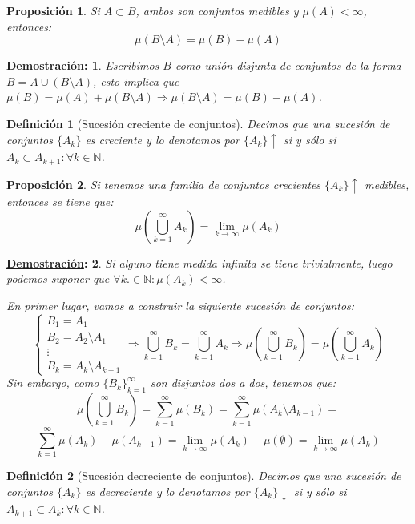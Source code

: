 \documentclass[10pt,a4paper,openright]{book}
\theoremstyle{break}
\newtheorem*{defi}{Definición}
\newtheorem*{prop}{Proposición}
\newtheorem*{demo}{\underline{Demostración}:}
\begin{document}
\begin{prop}
Si $A\subset B$, ambos son conjuntos medibles y $\mu(A) < \infty$, entonces:
$$\mu(B\setminus A) = \mu(B) - \mu(A)$$
\end{prop}
\begin{demo}
Escribimos $B$ como unión disjunta de conjuntos de la forma $B=A\cup (B\setminus A)$, esto implica que $\mu(B) = \mu(A) + \mu(B\setminus A) \Rightarrow \mu(B\setminus A) =  \mu(B) - \mu(A)$.
\end{demo}

\begin{defi}[Sucesión creciente de conjuntos]
Decimos que una sucesión de conjuntos $\{A_k\}$ es creciente y lo denotamos por $\{A_k\}\uparrow$ si y sólo si $A_k \subset A_{k+1} : \forall k  \in \mathbb{N}$.
\end{defi}

\begin{prop}
Si tenemos una familia de conjuntos crecientes $\{A_k\}\uparrow$ medibles, entonces se tiene que:
$$\mu\left(\bigcup_{k=1}^\infty A_k\right) = \lim_{k\rightarrow \infty} \mu(A_k)$$
\end{prop}
\begin{demo}
Si alguno tiene medida infinita se tiene trivialmente, luego podemos suponer que $\forall k .\in \mathbb{N}: \mu(A_k) < \infty$.

En primer lugar, vamos a construir la siguiente sucesión de conjuntos:
$$\begin{cases}
B_1 = A_1 \\
B_2 = A_2\setminus A_1 \\
\vdots \\ 
B_k = A_k \setminus A_{k-1}
\end{cases} \Rightarrow \bigcup_{k=1}^\infty B_k = \bigcup_{k=1}^\infty A_k \Rightarrow \mu\left(\bigcup_{k=1}^\infty B_k\right) = \mu\left(\bigcup_{k=1}^\infty A_k\right)$$
Sin embargo, como $\{B_k\}_{k=1}^\infty$ son disjuntos dos a dos, tenemos que:
$$\mu\left(\bigcup_{k=1}^\infty B_k\right) = \sum_{k=1}^\infty \mu(B_k) =\sum_{k=1}^\infty \mu(A_k\setminus A_{k-1}) =$$
$$\sum_{k=1}^\infty \mu(A_k)- \mu(A_{k-1}) = \lim_{k\rightarrow \infty} \mu(A_k) - \mu(\emptyset) = \lim_{k\rightarrow \infty}\mu(A_k)$$
\end{demo}

\begin{defi}[Sucesión decreciente de conjuntos]
Decimos que una sucesión de conjuntos $\{A_k\}$ es decreciente y lo denotamos por $\{A_k\}\downarrow$ si y sólo si $A_{k+1} \subset A_{k} : \forall k  \in \mathbb{N}$.
\end{defi}
\end{document}
